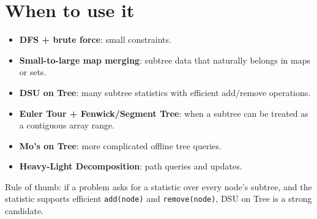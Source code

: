 \section{When to use it}
\begin{itemize}
\item \textbf{DFS + brute force}: small constraints.
\item \textbf{Small-to-large map merging}: subtree data that naturally belongs in maps or sets.
\item \textbf{DSU on Tree}: many subtree statistics with efficient add/remove operations.
\item \textbf{Euler Tour + Fenwick/Segment Tree}: when a subtree can be treated as a contiguous array range.
\item \textbf{Mo's on Tree}: more complicated offline tree queries.
\item \textbf{Heavy-Light Decomposition}: path queries and updates.
\end{itemize}

Rule of thumb: if a problem asks for a statistic over every node's subtree, and the statistic supports efficient \texttt{add(node)} and \texttt{remove(node)}, DSU on Tree is a strong candidate.
